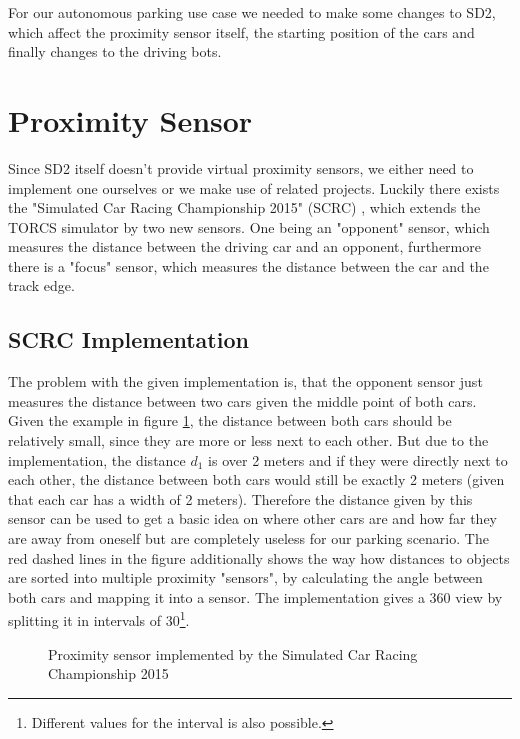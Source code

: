 \documentclass[paper=a4, fontsize=11pt]{scrreprt}
\begin{document}
For our autonomous parking use case we needed to make some changes to SD2,
which affect the proximity sensor itself, the starting position of the cars
and finally changes to the driving bots.

\section{Proximity Sensor}
Since SD2 itself doesn't provide virtual proximity sensors,
we either need to implement one ourselves or we make use of related projects.
Luckily there exists the "Simulated Car Racing Championship 2015" (SCRC) \cite{scrc2015},
which extends the TORCS simulator by two new sensors.
One being an "opponent" sensor, which measures the distance between the driving car and an opponent,
furthermore there is a "focus" sensor, which measures the distance between the car and the track edge.

\subsection{SCRC Implementation}
The problem with the given implementation is,
that the opponent sensor just measures the distance between two cars given the middle point of both cars.
Given the example in figure \ref{aw_scrc_impl}, the distance between both cars should be relatively small,
since they are more or less next to each other.
But due to the implementation, the distance $d_1$ is over 2 meters and if they were directly next to each other,
the distance between both cars would still be exactly 2 meters (given that each car has a width of 2 meters).
Therefore the distance given by this sensor can be used to get a basic idea on where other cars are
and how far they are away from oneself but are completely useless for our parking scenario.
The red dashed lines in the figure additionally shows the way how distances to objects are sorted into multiple proximity "sensors",
by calculating the angle between both cars and mapping it into a sensor.
The implementation gives a 360\degree{} view by splitting it in intervals of 30\degree{}\footnote{Different values for the interval is also possible.}.

\begin{figure}
\begin{center}
\end{center}
\caption{Proximity sensor implemented by the Simulated Car Racing Championship 2015}\label{aw_scrc_impl}
\end{figure}
\end{document}
